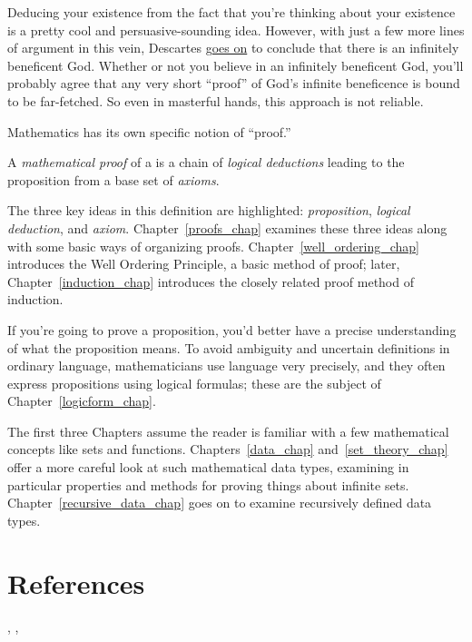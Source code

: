 Deducing your existence from the fact that you're thinking about your
existence is a pretty cool and persuasive-sounding idea.  However,
with just a few more lines of argument in this vein, Descartes
\href{http://www.btinternet.com/~glynhughes/squashed/descartes.htm}{goes
  on} to conclude that there is an infinitely beneficent God.  Whether
or not you believe in an infinitely beneficent God, you'll probably
agree that any very short ``proof'' of God's infinite beneficence is
bound to be far-fetched.  So even in masterful hands, this approach is
not reliable.

Mathematics has its own specific notion of ``proof.''

\begin{definition*}
A \emph{mathematical proof} of a  is a chain of \emph{logical
deductions} leading to the proposition from a base set of%
\emph{axioms}.
\end{definition*}

The three key ideas in this definition are highlighted:
\emph{proposition}, \emph{logical deduction}, and \emph{axiom}.
Chapter~\ref{proofs_chap} examines these three ideas along with some
basic ways of organizing proofs.  Chapter~\ref{well_ordering_chap}
introduces the Well Ordering Principle, a basic method of proof; later,
Chapter~\ref{induction_chap} introduces the closely related proof
method of induction.

If you're going to prove a proposition, you'd better have a precise
understanding of what the proposition means.  To avoid ambiguity and
uncertain definitions in ordinary language, mathematicians use
language very precisely, and they often express propositions using
logical formulas; these are the subject of
Chapter~\ref{logicform_chap}.

The first three Chapters assume the reader is familiar with a few
mathematical concepts like sets and functions.
Chapters~\ref{data_chap} and~\ref{set_theory_chap} offer a more
careful look at such mathematical data types, examining in particular
properties and methods for proving things about infinite sets.
Chapter~\ref{recursive_data_chap} goes on to examine recursively
defined data types.

\iffalse
Number theory is the study of properties of the integers.  This part
of the text ends with Chapter~\ref{number_theory_chap} on Number
theory because there are lots of easy-to-state and
interesting-to-prove properties of numbers.  This subject was once
thought to have few, if any, practical applications, but it has turned
out to have multiple applications in Computer Science.  For example,
most modern data encryption methods are based on Number theory.
\fi


\section{References}
 \cite{Cupillari12},
 \cite{Velleman94},
 \cite{AignerG99}     %

\endinput

